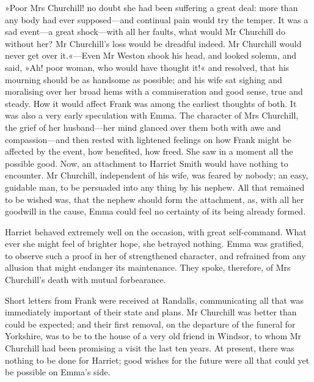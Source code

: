 »Poor Mrs Churchill! no doubt she had been suffering a great deal: more than any body had ever supposed—and continual pain would try the temper. It was a sad event—a great shock—with all her faults, what would Mr Churchill do without her? Mr Churchill's loss would be dreadful indeed. Mr Churchill would never get over it.«—Even Mr Weston shook his head, and looked solemn, and said, »Ah! poor woman, who would have thought it!« and resolved, that his mourning should be as handsome as possible; and his wife sat sighing and moralising over her broad hems with a commiseration and good sense, true and steady. How it would affect Frank was among the earliest thoughts of both. It was also a very early speculation with Emma. The character of Mrs Churchill, the grief of her husband—her mind glanced over them both with awe and compassion—and then rested with lightened feelings on how Frank might be affected by the event, how benefited, how freed. She saw in a moment all the possible good. Now, an attachment to Harriet Smith would have nothing to encounter. Mr Churchill, independent of his wife, was feared by nobody; an easy, guidable man, to be persuaded into any thing by his nephew. All that remained to be wished was, that the nephew should form the attachment, as, with all her goodwill in the cause, Emma could feel no certainty of its being already formed.

Harriet behaved extremely well on the occasion, with great self-command. What ever she might feel of brighter hope, she betrayed nothing. Emma was gratified, to observe such a proof in her of strengthened character, and refrained from any allusion that might endanger its maintenance. They spoke, therefore, of Mrs Churchill's death with mutual forbearance.

Short letters from Frank were received at Randalls, communicating all that was immediately important of their state and plans. Mr Churchill was better than could be expected; and their first removal, on the departure of the funeral for Yorkshire, was to be to the house of a very old friend in Windsor, to whom Mr Churchill had been promising a visit the last ten years. At present, there was nothing to be done for Harriet; good wishes for the future were all that could yet be possible on Emma's side.

